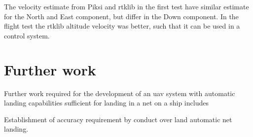
The velocity estimate from Piksi and \gls{rtklib} in the first test have similar estimate for the North and East component, but differ in the Down component. In the flight test the \gls{rtklib} altitude velocity was better, such that it can be used in a control system.
%
%
%
%
%
%
%
%
%
%
%
%
%
%
%
%
%


\section{Further work}
Further work required for the development of an \gls{uav} system with automatic landing capabilities sufficient for landing in a net on a ship includes

Establishment of accuracy requirement by conduct over land automatic net landing.

